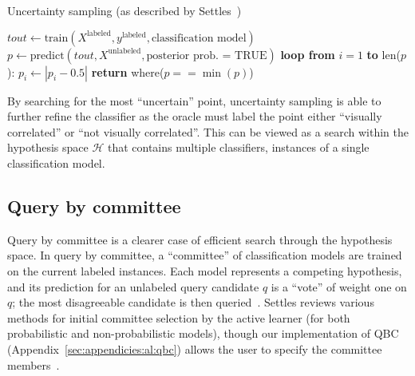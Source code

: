 \tablespacing
\begin{algorithm}[H]
	\caption{Uncertainty sampling (as described by 
	Settles~\cite{settles2010})}\label{alg:al:methods:uncertainty}
	\begin{algorithmic}[1]
		\State $\textit{tout} \gets 
		\text{train}(X^{\text{labeled}},y^{\text{labeled}},\text{classification 
		model})$
		\State $p \gets 
		\text{predict}(\textit{tout},X^{\text{unlabeled}},
		\text{posterior prob. = TRUE})$
		\State \textbf{loop from} $i=1$ \textbf{to} len($p$):
		\State \indent $p_i \gets |p_i-0.5|$
		\State \textbf{return} where($p==\min{(p)}$)
		\EndProcedure
	\end{algorithmic}
\end{algorithm}
\bodyspacing

\noindent By searching for the most ``uncertain'' point, uncertainty sampling 
is able to further refine the classifier as the oracle must label the point 
either ``visually correlated'' or ``not visually correlated''. This can be 
viewed as a search within the hypothesis space $\mathcal{H}$ that contains 
multiple classifiers, instances of a single classification model.








\subsection{Query by committee}
\label{sec:al:methods:qbc}

Query by committee is a clearer case of efficient search through the hypothesis 
space. In query by committee, a ``committee'' of classification models are 
trained on the  current labeled instances.  Each model represents a competing 
hypothesis, and its prediction for an unlabeled query candidate $q$ is a 
``vote'' of weight one on $q$; the most disagreeable candidate is then 
queried~\cite{settles2010}. Settles reviews various methods for initial 
committee selection by the active learner (for both probabilistic and 
non-probabilistic models), though our implementation of QBC 
(Appendix~\ref{sec:appendicies:al:qbc}) allows the user to specify the 
committee members~\cite{settles2010}. 

